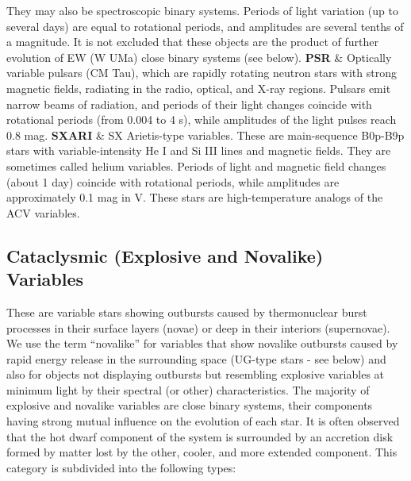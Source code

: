 \begin{longtabu}
They may also be spectroscopic binary systems. Periods of light
variation (up to several days) are equal to rotational periods, and
amplitudes are several tenths of a magnitude. It is not excluded that
these objects are the product of further evolution of EW (W UMa) close
binary systems (see below).\tabularnewline
\textbf{PSR} & Optically variable pulsars (CM Tau), which are rapidly
rotating neutron stars with strong magnetic fields, radiating in the
radio, optical, and X-ray regions. Pulsars emit narrow beams of
radiation, and periods of their light changes coincide with rotational
periods (from 0.004 to 4 s), while amplitudes of the light pulses reach
0.8 mag.\tabularnewline
\textbf{SXARI} & SX Arietis-type variables. These are main-sequence
B0p-B9p stars with variable-intensity He I and Si III lines and magnetic
fields. They are sometimes called helium variables. Periods of light and
magnetic field changes (about 1 day) coincide with rotational periods,
while amplitudes are approximately 0.1 mag in V. These stars are
high-temperature analogs of the ACV variables.\tabularnewline
\bottomrule
\end{longtabu}

\subsection{Cataclysmic (Explosive and Novalike)
Variables}\label{cataclysmic-explosive-and-novalike-variables}

These are variable stars showing outbursts caused by thermonuclear burst
processes in their surface layers (novae) or deep in their interiors
(supernovae). We use the term ``novalike'' for variables that show
novalike outbursts caused by rapid energy release in the surrounding
space (UG-type stars - see below) and also for objects not displaying
outbursts but resembling explosive variables at minimum light by their
spectral (or other) characteristics. The majority of explosive and
novalike variables are close binary systems, their components having
strong mutual influence on the evolution of each star. It is often
observed that the hot dwarf component of the system is surrounded by an
accretion disk formed by matter lost by the other, cooler, and more
extended component. This category is subdivided into the following
types:

